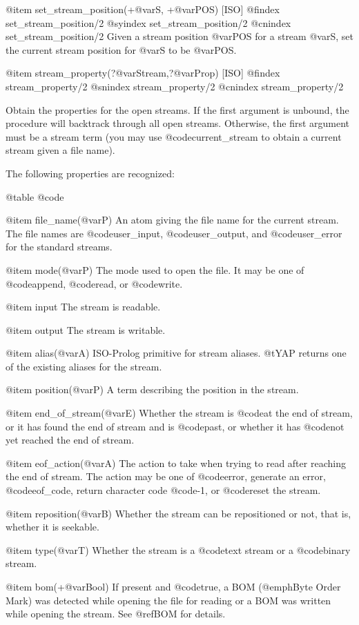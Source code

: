 {{{{@item set_stream_position(+@var{S}, +@var{POS}) [ISO]
@findex set_stream_position/2
@syindex set_stream_position/2
@cnindex set_stream_position/2
Given a stream position @var{POS} for a stream @var{S}, set the current
stream position for @var{S} to be @var{POS}.

@item stream_property(?@var{Stream},?@var{Prop}) [ISO]
@findex stream_property/2
@snindex stream_property/2
@cnindex stream_property/2

Obtain the properties for the open streams. If the first argument is
unbound, the procedure will backtrack through all open
streams. Otherwise, the first argument must be a stream term (you may
use @code{current_stream} to obtain a current stream given a file name).

The following properties are recognized:

@table @code

@item file_name(@var{P})
An atom giving the file name for the current stream. The file names are
@code{user_input}, @code{user_output}, and @code{user_error} for the
standard streams.

@item mode(@var{P})
The mode used to open the file. It may be one of @code{append},
@code{read}, or @code{write}.

@item input
The stream is readable.

@item output
The stream is writable.

@item alias(@var{A})
ISO-Prolog primitive for stream aliases. @t{YAP} returns one of the
existing aliases for the stream.

@item position(@var{P})
A term describing the position in the stream.

@item end_of_stream(@var{E})
Whether the stream is @code{at} the end of stream, or it has found the
end of stream and is @code{past}, or whether it has @code{not} yet
reached the end of stream.

@item eof_action(@var{A})
The action to take when trying to read after reaching the end of
stream. The action may be one of @code{error}, generate an error,
@code{eof_code}, return character code @code{-1}, or @code{reset} the
stream.

@item reposition(@var{B})
Whether the stream can be repositioned or not, that is, whether it is
seekable.

@item type(@var{T})
Whether the stream is a @code{text} stream or a @code{binary} stream.

@item bom(+@var{Bool})
If present and @code{true}, a BOM (@emph{Byte Order Mark}) was
detected while opening the file for reading or a BOM was written while
opening the stream. See @ref{BOM} for details.

}}}}
